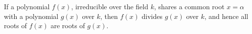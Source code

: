 If a polynomial $f(x)$, irreducible over the field $k$, shares a common root $x = \alpha$ with a polynomial $g(x)$ over $k$, then $f(x)$ divides $g(x)$ over $k$, and hence all roots of $f(x)$ are roots of $g(x)$.
